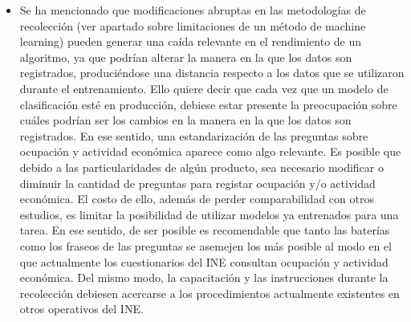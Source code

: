 \documentclass[
  12pt,
  spanish,
]{article}
\begin{document}
\begin{itemize}
  \item Se ha mencionado que modificaciones abruptas en las metodologías de recolección (ver apartado sobre limitaciones de un método de machine learning) pueden generar una caída relevante en el rendimiento de un algoritmo, ya que podrían alterar la manera en la que los datos son registrados, produciéndose una distancia respecto a los datos que se utilizaron durante el entrenamiento. Ello quiere decir que cada vez que un modelo de clasificación esté en producción, debiese estar presente la preocupación sobre cuáles podrían ser los cambios en la manera en la que los datos son registrados. En ese sentido, una estandarización de las preguntas sobre ocupación y actividad económica aparece como algo relevante. Es posible que debido a las particularidades de algún producto, sea necesario modificar o diminuir la cantidad de preguntas para registar ocupación y/o actividad económica. El costo de ello, además de perder comparabilidad con otros estudios, es limitar la posibilidad de utilizar modelos ya entrenados para una tarea. En ese sentido, de ser posible es recomendable que tanto las baterías como los fraseos de las preguntas se asemejen los más posible al modo en el que actualmente los cuestionarios del INE consultan ocupación y actividad económica. Del mismo modo, la capacitación y las instrucciones durante la recolección debiesen acercarse a los procedimientos actualmente existentes en otros operativos del INE.         


\end{itemize}
\end{document}
